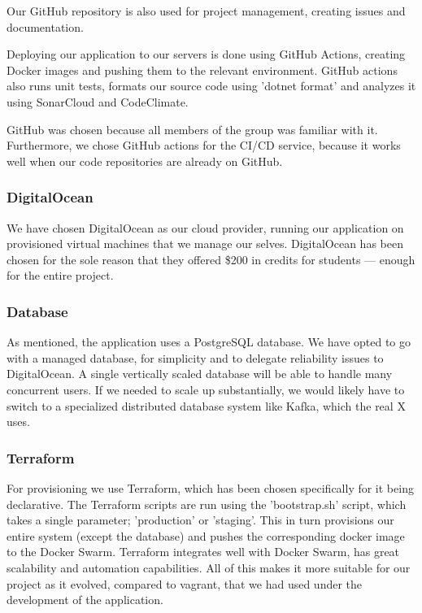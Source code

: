 Our GitHub repository is also used for project management, creating issues and documentation.

Deploying our application to our servers is done using GitHub Actions, creating Docker images and pushing them to the relevant environment. GitHub actions also runs unit tests, formats our source code using 'dotnet format' and analyzes it using SonarCloud and CodeClimate.

GitHub was chosen because all members of the group was familiar with it. Furthermore, we chose GitHub actions for the CI/CD service, because it works well when our code repositories are already on GitHub. 

\subsubsection{DigitalOcean}
We have chosen DigitalOcean as our cloud provider, running our application on provisioned virtual machines that we manage our selves. DigitalOcean has been chosen for the sole reason that they offered \$200 in credits for students — enough for the entire project.

\subsubsection{Database}
As mentioned, the application uses a PostgreSQL database. We have opted to go with a managed database, for simplicity and to delegate reliability issues to DigitalOcean. A single vertically scaled database will be able to handle many concurrent users. If we needed to scale up substantially, we would likely have to switch to a specialized distributed database system like Kafka, which the real X uses\cite{kafka}.

\subsubsection{Terraform}
For provisioning we use Terraform, which has been chosen specifically for it being declarative. The Terraform scripts are run using the 'bootstrap.sh' script, which takes a single parameter; 'production' or 'staging'. This in turn provisions our entire system (except the database) and pushes the corresponding docker image to the Docker Swarm. Terraform integrates well with Docker Swarm, has great scalability and automation capabilities. All of this makes it more suitable for our project as it evolved, compared to vagrant, that we had used under the development of the application. 

